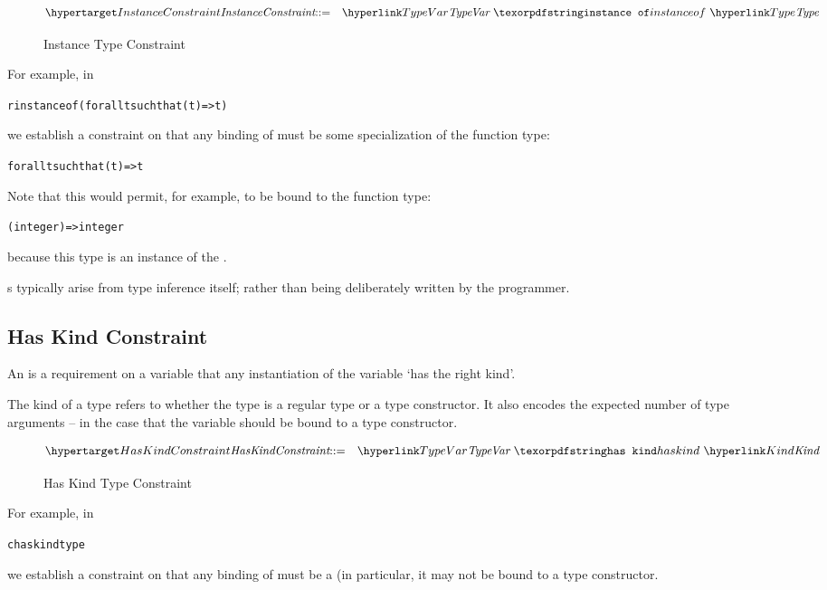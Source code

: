 \begin{figure}[htbp]
\begin{eqnarray*}
\ntDef{InstanceConstraint}&\arrow&\ntRef{TypeVar}\ \q{instance of}\ \ntRef{Type}
\end{eqnarray*}
\caption{Instance Type Constraint}
\label{instanceConstraintFig}
\end{figure}

For example, in 
\begin{alltt}
\pcent{}r instance of (for all t such that (t)=>t)
\end{alltt}
we establish a constraint on  that any binding of  must be some specialization of the function type:
\begin{alltt}
for all t such that (t)=>t
\end{alltt}
Note that this would permit, for example,  to be bound to the  function type:
\begin{alltt}
(integer)=>integer
\end{alltt}
because this type is an instance of the .

\begin{aside}
s typically arise from type inference itself; rather than being deliberately written by the programmer. 
\end{aside}


\subsection{Has Kind Constraint}
\label{hasKindConstraint}
An  is a requirement on a variable that any instantiation of the variable `has the right kind'.

The kind of a type refers to whether the type is a regular type or a type constructor. It also encodes the expected number of type arguments -- in the case that the variable should be bound to a type constructor.

\begin{figure}[htbp]
\begin{eqnarray*}
\ntDef{HasKindConstraint}&\arrow&\ntRef{TypeVar}\ \q{has kind}\ \ntRef{Kind}
\end{eqnarray*}
\caption{Has Kind Type Constraint}
\label{hasKindConstraintFig}
\end{figure}

For example, in 
\begin{alltt}
\pcent{}c has kind type
\end{alltt}
we establish a constraint on  that any binding of  must be a  (in particular, it may not be bound to a type constructor.

